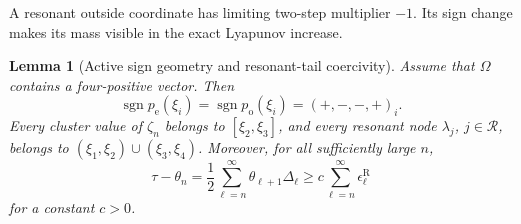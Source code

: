 \documentclass[11pt]{article}
\newtheorem{lemma}{Lemma}[section]
\begin{document}
A resonant outside coordinate has limiting two-step multiplier \(-1\).
Its sign change makes its mass visible in the exact Lyapunov increase.

\begin{lemma}[Active sign geometry and resonant-tail coercivity]
\label{lem:resonant-geometry-tail}
Assume that \(\Omega\) contains a four-positive vector.  Then
\[
 \operatorname{sgn}p_{\mathrm e}(\xi_i)
 =\operatorname{sgn}p_{\mathrm o}(\xi_i)
 =(+,-,-,+)_i.
\tag{27}\label{eq:active-sign-pattern}
\]
Every cluster value of \(\zeta_n\) belongs to
\([\xi_2,\xi_3]\), and every resonant node \(\lambda_j\),
\(j\in\mathcal R\), belongs to
\((\xi_1,\xi_2)\cup(\xi_3,\xi_4)\).  Moreover, for all sufficiently large
\(n\),
\[
 \tau-\theta_n
 =\frac12\sum_{\ell=n}^{\infty}\theta_{\ell+1}\Delta_\ell
 \geq c\sum_{\ell=n}^{\infty}\epsilon_\ell^{\mathrm R}
\tag{28}\label{eq:resonant-tail-coercivity}
\]
for a constant \(c>0\).
\end{lemma}
\end{document}
